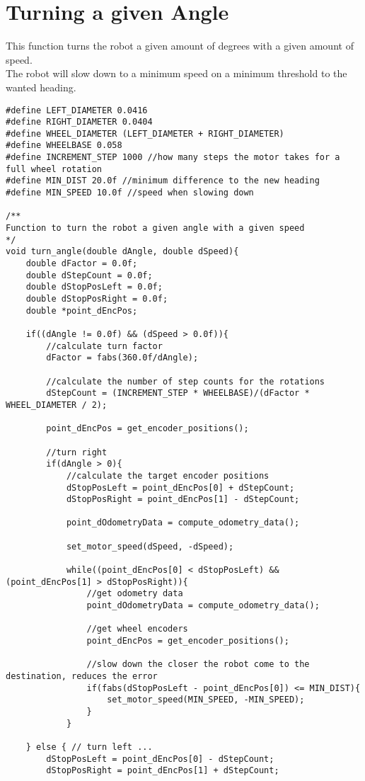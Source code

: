 \section{Turning a given Angle}
This function turns the robot a given amount of degrees with a given amount of speed.\\
The robot will slow down to a minimum speed on a minimum threshold to the wanted heading. 

\begin{lstlisting}
#define LEFT_DIAMETER 0.0416
#define RIGHT_DIAMETER 0.0404
#define WHEEL_DIAMETER (LEFT_DIAMETER + RIGHT_DIAMETER)
#define WHEELBASE 0.058 
#define INCREMENT_STEP 1000 //how many steps the motor takes for a full wheel rotation
#define MIN_DIST 20.0f //minimum difference to the new heading
#define MIN_SPEED 10.0f //speed when slowing down

/**
Function to turn the robot a given angle with a given speed
*/
void turn_angle(double dAngle, double dSpeed){
	double dFactor = 0.0f;
	double dStepCount = 0.0f;
	double dStopPosLeft = 0.0f;
	double dStopPosRight = 0.0f;
	double *point_dEncPos;
	
	if((dAngle != 0.0f) && (dSpeed > 0.0f)){
		//calculate turn factor
		dFactor = fabs(360.0f/dAngle);
		
		//calculate the number of step counts for the rotations
		dStepCount = (INCREMENT_STEP * WHEELBASE)/(dFactor * WHEEL_DIAMETER / 2);
		
		point_dEncPos = get_encoder_positions();
		
		//turn right
		if(dAngle > 0){
			//calculate the target encoder positions
			dStopPosLeft = point_dEncPos[0] + dStepCount;
			dStopPosRight = point_dEncPos[1] - dStepCount;
			
			point_dOdometryData = compute_odometry_data();
			
			set_motor_speed(dSpeed, -dSpeed);
			
			while((point_dEncPos[0] < dStopPosLeft) && (point_dEncPos[1] > dStopPosRight)){
				//get odometry data
				point_dOdometryData = compute_odometry_data();
				
				//get wheel encoders
				point_dEncPos = get_encoder_positions();
				
				//slow down the closer the robot come to the destination, reduces the error
				if(fabs(dStopPosLeft - point_dEncPos[0]) <= MIN_DIST){
					set_motor_speed(MIN_SPEED, -MIN_SPEED);
				}
			}	
		
	} else { // turn left ...
		dStopPosLeft = point_dEncPos[0] - dStepCount;
		dStopPosRight = point_dEncPos[1] + dStepCount;
		

\end{lstlisting}
